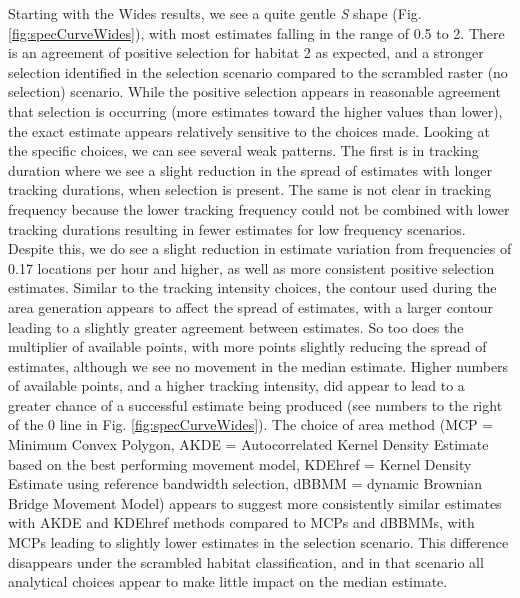 \documentclass[10pt,a4paper]{article}
\begin{document}
Starting with the Wides results, we see a quite gentle \emph{S} shape (Fig. \ref{fig:specCurveWides}), with most estimates falling in the range of 0.5 to 2.
There is an agreement of positive selection for habitat 2 as expected, and a stronger selection identified in the selection scenario compared to the scrambled raster (no selection) scenario.
While the positive selection appears in reasonable agreement that selection is occurring (more estimates toward the higher values than lower), the exact estimate appears relatively sensitive to the choices made.
Looking at the specific choices, we can see several weak patterns.
The first is in tracking duration where we see a slight reduction in the spread of estimates with longer tracking durations, when selection is present.
The same is not clear in tracking frequency because the lower tracking frequency could not be combined with lower tracking durations resulting in fewer estimates for low frequency scenarios.
Despite this, we do see a slight reduction in estimate variation from frequencies of 0.17 locations per hour and higher, as well as more consistent positive selection estimates.
Similar to the tracking intensity choices, the contour used during the area generation appears to affect the spread of estimates, with a larger contour leading to a slightly greater agreement between estimates.
So too does the multiplier of available points, with more points slightly reducing the spread of estimates, although we see no movement in the median estimate.
Higher numbers of available points, and a higher tracking intensity, did appear to lead to a greater chance of a successful estimate being produced (see numbers to the right of the 0 line in Fig. \ref{fig:specCurveWides}).
The choice of area method (MCP = Minimum Convex Polygon, AKDE = Autocorrelated Kernel Density Estimate based on the best performing movement model, KDEhref = Kernel Density Estimate using reference bandwidth selection, dBBMM = dynamic Brownian Bridge Movement Model) appears to suggest more consistently similar estimates with AKDE and KDEhref methods compared to MCPs and dBBMMs, with MCPs leading to slightly lower estimates in the selection scenario.
This difference disappears under the scrambled habitat classification, and in that scenario all analytical choices appear to make little impact on the median estimate.
\end{document}
